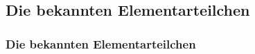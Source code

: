 \documentclass{beamer}
\begin{document}
\subsection{Die bekannten Elementarteilchen}
\begin{frame}
  \frametitle{Die bekannten Elementarteilchen}
  \vskip-0.8cm
  \begin{columns}[T]
    \begin{column}{0.5\textwidth}
      \begin{center}
\end{center}
\end{column}
\end{columns}
\end{frame}
\end{document}
